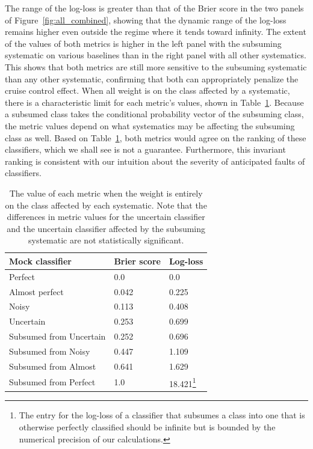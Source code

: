 The range of the log-loss is greater than that of the Brier score in the two panels of Figure~\ref{fig:all_combined}, showing that the dynamic range of the log-loss remains higher even outside the regime where it tends toward infinity.
The extent of the values of both metrics is higher in the left panel with the subsuming systematic on various baselines than in the right panel with all other systematics.
This shows that both metrics are still more sensitive to the subsuming systematic than any other systematic, confirming that both can appropriately penalize the cruise control effect.
When all weight is on the class affected by a systematic, there is a characteristic limit for each metric's values, shown in Table~\ref{tab:extents}.
Because a subsumed class takes the conditional probability vector of the subsuming class, the metric values depend on what systematics may be affecting the subsuming class as well.
Based on Table~\ref{tab:extents}, both metrics would agree on the ranking of these classifiers, which we shall see is not a guarantee.
Furthermore, this invariant ranking is consistent with our intuition about the severity of anticipated faults of classifiers.

\begin{table}[]
\begin{tabular}{lll}
Mock classifier & Brier score & Log-loss\\
\hline
Perfect & 0.0 & 0.0\\
Almost perfect & 0.042 & 0.225\\
Noisy & 0.113 & 0.408\\
Uncertain & 0.253 & 0.699\\
Subsumed from Uncertain & 0.252 & 0.696\\
Subsumed from Noisy & 0.447 & 1.109\\
Subsumed from Almost & 0.641 & 1.629\\
Subsumed from Perfect & 1.0 & 18.421\footnote{The entry for the log-loss of a classifier that subsumes a class into one that is otherwise perfectly classified should be infinite but is bounded by the numerical precision of our calculations.}
\end{tabular}
\caption{The value of each metric when the weight is entirely on the class affected by each systematic.
Note that the differences in metric values for the uncertain classifier and the uncertain classifier affected by the subsuming systematic are not statistically significant.}
\label{tab:extents}
\end{table}

